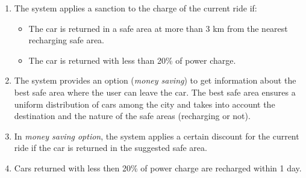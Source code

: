 \begin{enumerate}
\begin{itemize}
					\end{itemize}
				\item The system applies a sanction to the charge of the current ride if:
					\begin{itemize}
						\item The car is returned in a safe area at more than 3 km from the nearest recharging safe area.
						\item The car is returned with less than 20\% of power charge.
					\end{itemize}
				\item The system provides an option (\textit{money saving}) to get information about the best safe area where the user can leave the car. The best safe area ensures a uniform distribution of cars among the city and takes into account the destination and the nature of the safe areas (recharging or not).
				\item In \textit{money saving option}, the system applies a certain discount for the current ride if the car is returned in the suggested safe area. %
				\item Cars returned with less then 20\% of power charge are recharged within 1 day.
			\end{enumerate}
			
			
			
			
